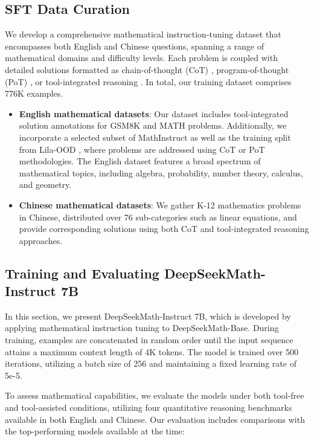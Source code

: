 \begin{itemize}[topsep=0pt]
\subsection{SFT Data Curation}

We develop a comprehensive mathematical instruction-tuning dataset that encompasses both English and Chinese questions, spanning a range of mathematical domains and difficulty levels. Each problem is coupled with detailed solutions formatted as chain-of-thought (CoT) \citep{cot}, program-of-thought (PoT) \citep{pot,pal}, or tool-integrated reasoning \citep{tora}. In total, our training dataset comprises 776K examples.

\begin{itemize}[topsep=0pt]
    \item \textbf{English mathematical datasets}: Our dataset includes tool-integrated solution annotations for GSM8K and MATH problems. Additionally, we incorporate a selected subset of MathInstruct \citep{MathInstruct} as well as the training split from Lila-OOD \citep{lila}, where problems are addressed using CoT or PoT methodologies. The English dataset features a broad spectrum of mathematical topics, including algebra, probability, number theory, calculus, and geometry.
    \item \textbf{Chinese mathematical datasets}: We gather K-12 mathematics problems in Chinese, distributed over 76 sub-categories such as linear equations, and provide corresponding solutions using both CoT and tool-integrated reasoning approaches.
\end{itemize}

\subsection{Training and Evaluating DeepSeekMath-Instruct 7B}

In this section, we present DeepSeekMath-Instruct 7B, which is developed by applying mathematical instruction tuning to DeepSeekMath-Base. During training, examples are concatenated in random order until the input sequence attains a maximum context length of 4K tokens. The model is trained over 500 iterations, utilizing a batch size of 256 and maintaining a fixed learning rate of 5e-5.

To assess mathematical capabilities, we evaluate the models under both tool-free and tool-assisted conditions, utilizing four quantitative reasoning benchmarks available in both English and Chinese. Our evaluation includes comparisons with the top-performing models available at the time:


\end{itemize}
